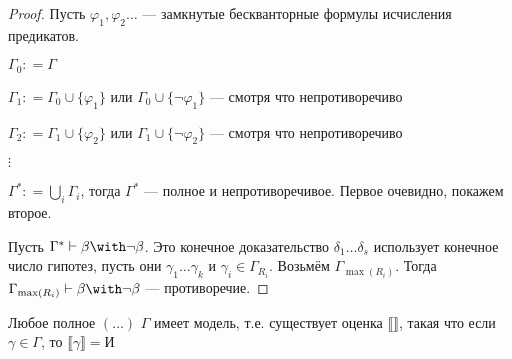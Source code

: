 \begin{proof}
    Пусть \(\varphi_1, \varphi_2 \dots \) --- замкнутые бескванторные формулы исчисления предикатов.

    \(\Gamma_0: = \Gamma\)

    \(\Gamma_1 : = \Gamma_0 \cup \{\varphi_1\} \) или \(\Gamma_0 \cup \{\neg \varphi_1\} \) --- смотря что непротиворечиво

    \(\Gamma_2 : = \Gamma_1 \cup \{\varphi_2\} \) или \(\Gamma_1 \cup \{\neg \varphi_2\} \) --- смотря что непротиворечиво

    \(\vdots\)

    \(\Gamma^* : = \bigcup_i \Gamma_i\), тогда \(\Gamma^*\) --- полное и непротиворечивое. Первое очевидно, покажем второе.

    Пусть \(\Gamma^* \vdash \beta \with \neg \beta\). Это конечное доказательство \(\delta_1 \dots \delta_s\) использует конечное число гипотез, пусть они \(\gamma_1 \dots \gamma_k\) и \(\gamma_i \in \Gamma_{R_i}\). Возьмём \(\Gamma_{\max(R_i)}\). Тогда \(\Gamma_{\max(R_i)} \vdash \beta \with \neg \beta\) --- противоречие.
\end{proof}

\begin{theorem}
    Любое полное \((\ldots)\) \(\Gamma\) имеет модель, т.е. существует оценка \(\llbracket  \rrbracket\), такая что если \(\gamma \in \Gamma\), то \(\llbracket \gamma \rrbracket = \text{И}\)
\end{theorem}

